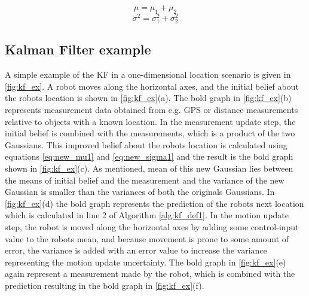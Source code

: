 \begin{equation}
\label{eq:new_mu2}
\mu = \mu_{1} + \mu_{2}
\end{equation}
\begin{equation}
\label{eq:new_sigma2}
\sigma^2 = \sigma_{1}^2 + \sigma_{2}^2
\end{equation}

\subsection{Kalman Filter example}

A simple example of the KF in a one-dimensional location scenario is given in \autoref{fig:kf_ex}. A robot moves along the horizontal axes, and the initial belief about the robots location is shown in \autoref{fig:kf_ex}(a). The bold graph in \autoref{fig:kf_ex}(b) represents measurement data obtained from e.g. GPS or distance measurements relative to objects with a known location. In the measurement update step, the initial belief is combined with the measurements, which is a product of the two Gaussians. This improved belief about the robots location is calculated using equations \ref{eq:new_mu1} and \ref{eq:new_sigma1} and the result is the bold graph shown in \autoref{fig:kf_ex}(c). As mentioned, mean of this new Gaussian lies between the means of initial belief and the measurement and the variance of the new Gaussian is smaller than the variances of both the originals Gaussians. In \autoref{fig:kf_ex}(d) the bold graph represents the prediction of the robots next location which is calculated in line 2 of Algorithm \ref{alg:kf_def1}.
In the motion update step, the robot is moved along the horizontal axes by adding some control-input value to the robots mean, and because movement is prone to some amount of error, the variance is added with an error value to increase the variance representing the motion update uncertainty. The bold graph in \autoref{fig:kf_ex}(e) again represent a measurement made by the robot, which is combined with the prediction resulting in the bold graph in \autoref{fig:kf_ex}(f).

